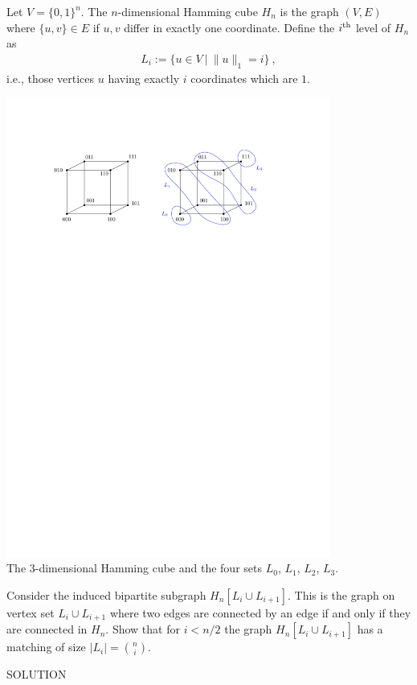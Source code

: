 \documentclass[11pt,a4paper,oneside]{article}
\newcommand{\nth}[1]{#1\textsuperscript{th}}
\newcommand{\norm}[1]{\|#1\|}
\begin{document}
Let $V = \{0,1\}^n$. The $n$-dimensional Hamming cube $H_n$ is the graph $(V,E)$ where
$\{u,v\} \in E$ if $u,v$ differ in exactly one coordinate.
Define the $\nth{i}$ level of $H_n$ as 
\begin{align*}
  L_i := \{u \in V \ | \ \norm{u}_1 = i \} \ ,
\end{align*}
i.e., those vertices $u$ having exactly $i$ coordinates which are $1$.
\begin{center}
  \includegraphics[width=0.8\textwidth]{figures/hamming-3-dim.pdf}\\
  {\small The $3$-dimensional Hamming cube and the four 
    sets $L_0$, $L_1$, $L_2$, $L_3$.}
\end{center}


\begin{problem}{4}
  \statement
  Consider the induced bipartite subgraph $H_n[ L_i \cup L_{i+1}]$. This is 
  the graph on vertex set $L_i \cup L_{i+1}$ where two edges are connected
  by an edge if and only if they are connected in $H_n$.
  Show that for $i < n/2$ the graph $H_n[ L_i \cup L_{i+1}]$
  has a matching of size $|L_i| = {n \choose i}$.
  
  \solution
  SOLUTION
\end{problem}
\end{document}
